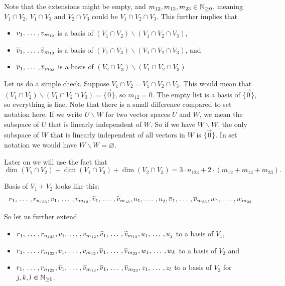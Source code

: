\begin{failedattempt}
  Note that the extensions might be empty, and $m_{12}, m_{13}, m_{23} \in \mathbb{N}_{\geq 0}$, meaning $V_1 \cap V_2$, $V_1 \cap V_3$ and $V_2 \cap V_3$ could be $V_1 \cap V_2 \cap V_3$. This further implies that
  \begin{itemize}
    \item $v_1, {\, \ldots \,\,}, v_{m_{12}}$ is a basis of $(V_1 \cap V_2) \backslash (V_1 \cap V_2 \cap V_3)$,
    \item $\widetilde{v}_1, {\, \ldots \,\,}, \widetilde{v}_{m_{13}}$ is a basis of $(V_1 \cap V_3) \backslash (V_1 \cap V_2 \cap V_3)$, and
    \item $\overline{v}_1, {\, \ldots \,\,}, \overline{v}_{m_{23}}$ is a basis of $(V_2 \cap V_3) \backslash (V_1 \cap V_2 \cap V_3)$.
  \end{itemize}
  Let us do a simple check. Suppose $V_1 \cap V_2 =  V_1 \cap V_2 \cap V_3$. This would mean that
  $(V_1 \cap V_2) \backslash (V_1 \cap V_2 \cap V_3) = \{ \vec 0 \}$, so $m_{12} = 0$. The empty list is a basis of $\{ \vec 0 \}$, so everything is fine. Note that there is a small difference compared to set notation here. If we write $U \backslash W$ for two vector spaces $U$ and $W$, we mean the subspace of $U$ that is linearly independent of $W$. So if we have $W \backslash W$, the only subspace of $W$ that is linearly independent of all vectors in $W$ is $\{ \vec 0 \}$. In set notation we would have $W \backslash W = \varnothing$.

  Later on we will use the fact that
  \begin{equation}
    \label{eq: fact for dim}
    \dim (V_1 \cap V_2) + \dim (V_1 \cap V_3) + \dim (V_2 \cap V_3) = 3\cdot n_{123} + 2\cdot (m_{12} + m_{13} + m_{23}).
  \end{equation}

  Basis of $V_1 + V_2$ looks like this:
  \[
    r_1, {\, \ldots \,\,}, r_{n_{123}}, v_1, {\, \ldots \,\,}, v_{m_{12}}, \widetilde{v}_1, {\, \ldots \,\,}, \widetilde{v}_{m_{13}}, u_1, {\, \ldots \,\,}, u_j, \overline{v}_1, {\, \ldots \,\,}, \overline{v}_{m_{23}}, w_1, {\, \ldots \,\,}, w_{m_{23}}
  \]

  So let us further extend
  \begin{itemize}
    \item $r_1, {\, \ldots \,\,}, r_{n_{123}}, v_1, {\, \ldots \,\,}, v_{m_{12}}, \widetilde{v}_1, {\, \ldots \,\,}, \widetilde{v}_{m_{13}}, u_1, {\, \ldots \,\,}, u_j$ to a basis of $V_1$,
    \item $r_1, {\, \ldots \,\,}, r_{n_{123}}, v_1, {\, \ldots \,\,}, v_{m_{12}}, \overline{v}_1, {\, \ldots \,\,}, \overline{v}_{m_{23}}, w_1, {\, \ldots \,\,}, w_k$ to a basis of $V_2$ and
    \item $r_1, {\, \ldots \,\,}, r_{n_{123}}, \widetilde{v}_1, {\, \ldots \,\,}, \widetilde{v}_{m_{13}}, \overline{v}_1, {\, \ldots \,\,}, \overline{v}_{m_{23}}, z_1, {\, \ldots \,\,}, z_l$ to a basis of $V_3$ for $j,k,l \in \mathbb{N}_{\geq 0}$.
  \end{itemize}


\end{failedattempt}
